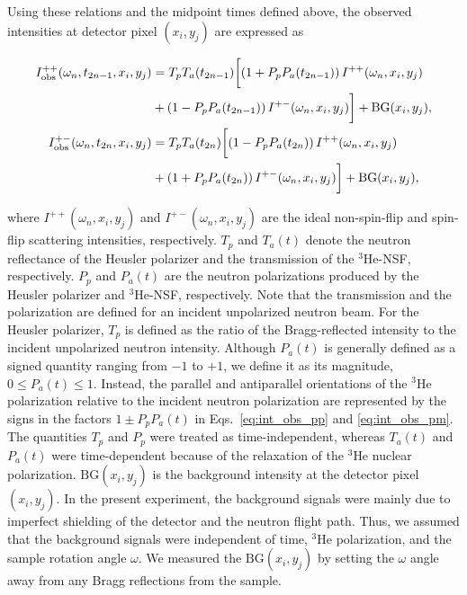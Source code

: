 \documentclass[%
 reprint,
superscriptaddress,
 amsmath,amssymb,
 aps,
floatfix,
]{revtex4-2}
\newcommand{\He}{$^3$He }
\newcommand{\Hensf}{$^3$He-NSF}
\begin{document}
Using these relations and the midpoint times defined above, the observed intensities at detector pixel $(x_i,y_j)$ are expressed as
\begin{widetext}
    \begin{align}
        I^{++}_\mathrm{obs}(\omega_n,t_{2n-1}, x_i,y_j) &= {T_pT_a(t_{2n-1})}\biggl[\left(1+ P_pP_a(t_{2n-1})\right)I^{++}(\omega_n, x_i,y_j) \notag\\
        &+\left(1- P_pP_a(t_{2n-1})\right)I^{+-}(\omega_n, x_i,y_j)\biggr]+\mathrm{BG}(x_i,y_j),
        \label{eq:int_obs_pp}\\
        I^{+-}_\mathrm{obs}(\omega_n,t_{2n}, x_i,y_j) &= {T_pT_a(t_{2n})}\biggl[\left(1- P_pP_a(t_{2n})\right)I^{++}(\omega_n, x_i,y_j) \notag\\
        &+\left(1+ P_pP_a(t_{2n})\right)I^{+-}(\omega_n, x_i,y_j)\biggr]+\mathrm{BG}(x_i,y_j),
        \label{eq:int_obs_pm}
    \end{align}
\end{widetext}
where $I^{++}(\omega_n,x_i,y_j)$ and $I^{+-}(\omega_n,x_i,y_j)$ are the ideal non-spin-flip and spin-flip scattering intensities, respectively.
$T_p$ and $T_a(t)$ denote the neutron reflectance of the Heusler polarizer and the transmission of the \Hensf, respectively.
$P_p$ and $P_a(t)$ are the neutron polarizations produced by the Heusler polarizer and \Hensf, respectively.
Note that the transmission and the polarization are defined for an incident unpolarized neutron beam.
For the Heusler polarizer, $T_p$ is defined as the ratio of the Bragg-reflected intensity to the incident unpolarized neutron intensity.
Although $P_a(t)$ is generally defined as a signed quantity ranging from $-1$ to $+1$, we define it as its magnitude, $0 \leq P_a(t) \leq 1$.
Instead, the parallel and antiparallel orientations of the \He polarization relative to the incident neutron polarization are represented by the signs in the factors $1\pm P_pP_a(t)$ in Eqs.~\ref{eq:int_obs_pp} and \ref{eq:int_obs_pm}.
The quantities $T_p$ and $P_p$ were treated as time-independent, whereas $T_a(t)$ and $P_a(t)$ were time-dependent because of the relaxation of the \He nuclear polarization.
$\mathrm{BG}(x_i,y_j)$ is the background intensity at the detector pixel $(x_i, y_j)$.
In the present experiment, the background signals were mainly due to imperfect shielding of the detector and the neutron flight path.
Thus, we assumed that the background signals were independent of time, \He polarization, and the sample rotation angle $\omega$. %
We measured the $\mathrm{BG}(x_i,y_j)$ by setting the $\omega$ angle away from any Bragg reflections from the sample.
\end{document}
